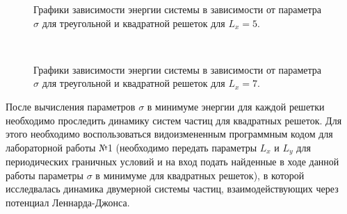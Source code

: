 \documentclass[14pt,a4paper,report]{ncc}
\begin{document}
 \begin{figure}[h]
\caption{Графики зависимости энергии системы в зависимости от параметра $\sigma$ для треугольной и квадратной решеток для $L_x=5$.}
\label{ris:image}
\end{figure}
\
  \begin{figure}[h]
\caption{Графики зависимости энергии системы в зависимости от параметра $\sigma$ для треугольной и квадратной решеток для $L_x=7$.}


\label{ris:image}
\end{figure}
После вычисления параметров $\sigma$ в минимуме энергии для каждой решетки необходимо проследить динамику систем частиц для квадратных решеток. Для этого необходимо воспользоваться видоизмененным программным кодом для лабораторной работы №1 (необходимо передать параметры $L_x$ и $L_y$ для периодических граничных условий и на вход подать найденные в ходе данной работы параметры $\sigma$ в минимуме для квадратных решеток), в которой исследвалась динамика двумерной системы частиц, взаимодействующих через потенциал Леннарда-Джонса.
\
\end{document}
